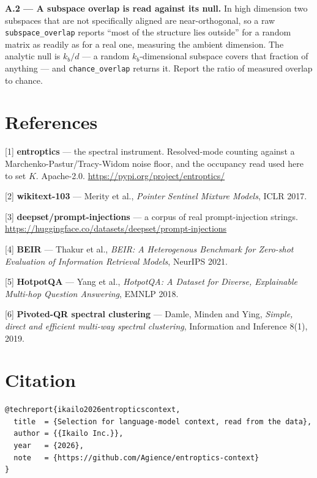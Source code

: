 \documentclass[10pt,letterpaper,twocolumn]{article}
\begin{document}
\textbf{A.2 --- A subspace overlap is read against its null.} In high dimension two subspaces that are
not specifically aligned are near-orthogonal, so a raw \texttt{subspace\_\allowbreak{}overlap} reports ``most of the
structure lies outside'' for a random matrix as readily as for a real one, measuring the ambient
dimension. The analytic null is \(k_b/d\) --- a random \(k_b\)-dimensional subspace covers that
fraction of anything --- and \texttt{chance\_\allowbreak{}overlap} returns it. Report the ratio of measured overlap to
chance.

\section{References}\label{references}

{[}1{]} \textbf{entroptics} --- the spectral instrument. Resolved-mode counting against a
Marchenk\allowbreak{}o-\allowbreak{}Pastur/\allowbreak{}Tracy-\allowbreak{}Widom noise floor, and the occupancy read used here to set \(K\).
Apache-2.0. \href{https://pypi.org/project/entroptics/}{https:\allowbreak{}/\allowbreak{}/\allowbreak{}pypi.\allowbreak{}org/\allowbreak{}project/\allowbreak{}entropti\allowbreak{}cs/}

{[}2{]} \textbf{wikitext-103} --- Merity et al., \emph{Pointer Sentinel Mixture Models}, ICLR 2017.

{[}3{]} \textbf{deepset/\allowbreak{}prompt-\allowbreak{}injectio\allowbreak{}ns} --- a corpus of real prompt-injection strings.
\href{https://huggingface.co/datasets/deepset/prompt-injections}{https:\allowbreak{}/\allowbreak{}/\allowbreak{}huggingf\allowbreak{}ace.\allowbreak{}co/\allowbreak{}datasets\allowbreak{}/\allowbreak{}deepset/\allowbreak{}prompt-\allowbreak{}injectio\allowbreak{}ns}

{[}4{]} \textbf{BEIR} --- Thakur et al., \emph{BEIR: A Heterogenous Benchmark for Zero-shot Evaluation of
Information Retrieval Models}, NeurIPS 2021.

{[}5{]} \textbf{HotpotQA} --- Yang et al., \emph{HotpotQA: A Dataset for Diverse, Explainable Multi-hop Question
Answering}, EMNLP 2018.

{[}6{]} \textbf{Pivoted-QR spectral clustering} --- Damle, Minden and Ying, \emph{Simple, direct and efficient
multi-way spectral clustering}, Information and Inference 8(1), 2019.

\section{Citation}\label{citation}

\begin{verbatim}
@techreport{ikailo2026entropticscontext,
  title  = {Selection for language-model context, read from the data},
  author = {{Ikailo Inc.}},
  year   = {2026},
  note   = {https://github.com/Agience/entroptics-context}
}
\end{verbatim}
\end{document}
